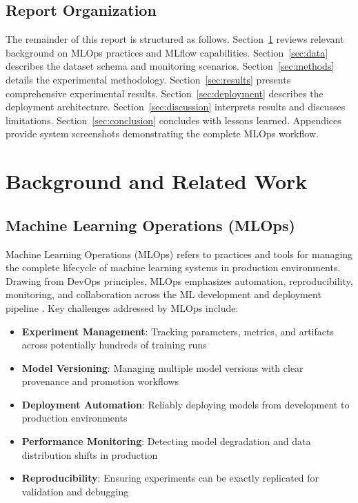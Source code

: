 \documentclass[11pt,a4paper]{article}
\begin{document}
\subsection{Report Organization}

The remainder of this report is structured as follows. Section~\ref{sec:related} reviews relevant background on MLOps practices and MLflow capabilities. Section~\ref{sec:data} describes the dataset schema and monitoring scenarios. Section~\ref{sec:methods} details the experimental methodology. Section~\ref{sec:results} presents comprehensive experimental results. Section~\ref{sec:deployment} describes the deployment architecture. Section~\ref{sec:discussion} interprets results and discusses limitations. Section~\ref{sec:conclusion} concludes with lessons learned. Appendices provide system screenshots demonstrating the complete MLOps workflow.

\section{Background and Related Work}
\label{sec:related}

\subsection{Machine Learning Operations (MLOps)}

Machine Learning Operations (MLOps) refers to practices and tools for managing the complete lifecycle of machine learning systems in production environments. Drawing from DevOps principles, MLOps emphasizes automation, reproducibility, monitoring, and collaboration across the ML development and deployment pipeline \cite{mlops-principles}. Key challenges addressed by MLOps include:

\begin{itemize}
    \item \textbf{Experiment Management}: Tracking parameters, metrics, and artifacts across potentially hundreds of training runs
    \item \textbf{Model Versioning}: Managing multiple model versions with clear provenance and promotion workflows
    \item \textbf{Deployment Automation}: Reliably deploying models from development to production environments
    \item \textbf{Performance Monitoring}: Detecting model degradation and data distribution shifts in production
    \item \textbf{Reproducibility}: Ensuring experiments can be exactly replicated for validation and debugging
\end{itemize}
\end{document}
